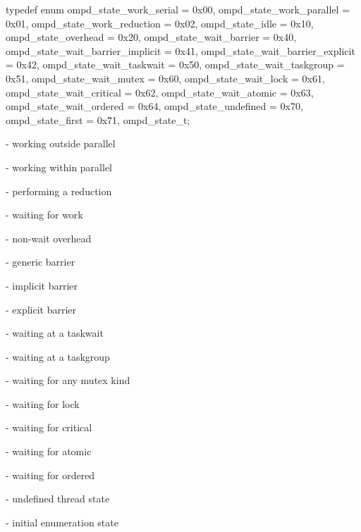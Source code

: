 \format

\begin{ccppspecific}
\begin{ompSyntax}
typedef enum {
  ompd_state_work_serial = 0x00,
  ompd_state_work_parallel = 0x01,
  ompd_state_work_reduction = 0x02,
  ompd_state_idle = 0x10,
  ompd_state_overhead = 0x20,
  ompd_state_wait_barrier = 0x40,
  ompd_state_wait_barrier_implicit = 0x41,
  ompd_state_wait_barrier_explicit = 0x42,
  ompd_state_wait_taskwait = 0x50,
  ompd_state_wait_taskgroup = 0x51,
  ompd_state_wait_mutex = 0x60,
  ompd_state_wait_lock = 0x61,
  ompd_state_wait_critical = 0x62,
  ompd_state_wait_atomic = 0x63,
  ompd_state_wait_ordered = 0x64,
  ompd_state_undefined = 0x70,
  ompd_state_first = 0x71,
} ompd_state_t;
\end{ompSyntax}
\end{ccppspecific}


\descr
\label{ompd_state_work_serial}
 - 
working outside parallel
 
\label{ompd_state_work_parallel}
 - 
working within parallel

\label{ompd_state_work_reduction}
 - 
performing a reduction

\label{ompd_state_idle}
 - 
waiting for work
 
\label{ompd_state_overhead}
 - 
non-wait overhead

\label{ompd_state_wait_barrier}
 - 
generic barrier

\label{ompd_state_wait_barrier_implicit}
 - 
implicit barrier

\label{ompd_state_wait_barrier_explicit}
 - 
explicit barrier

\label{ompd_state_wait_taskwait}
 - 
waiting at a taskwait

\label{ompd_state_wait_taskgroup}
 - 
waiting at a taskgroup

\label{ompd_state_wait_mutex}
 - 
waiting for any mutex kind

\label{ompd_state_wait_lock}
 - 
waiting for lock

\label{ompd_state_wait_critical}
 - 
waiting for critical

\label{ompd_state_wait_atomic}
 - 
waiting for atomic

\label{ompd_state_wait_ordered}
 - 
waiting for ordered

\label{ompd_state_undefined}
 - 
undefined thread state

\label{ompd_state_first}
 - 
initial enumeration state
